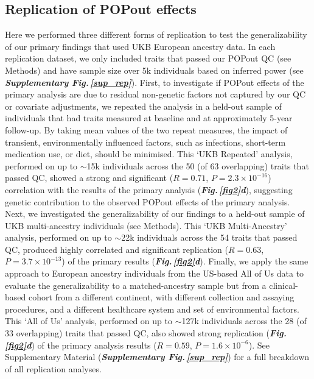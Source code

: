 \documentclass[12pt]{zHenriquesLab-StyleBioRxiv}
\newcommand\dref[2]{\normalsize{\textbf{\textit{Fig.\,\ref{#1}#2}}}\normalsize{}}
\newcommand\sref[1]{\normalsize{\textbf{\textit{Supplementary Fig.\,\ref{#1}}}}\normalsize{}}
\begin{document}
{{%
\subsection*{Replication of POPout effects} \label{sec:res1}
Here we performed three different forms of replication to test the generalizability of our primary 
findings that used UKB European ancestry data. In each replication dataset, 
we only included traits that passed our POPout QC (see Methods) and have sample size 
over 5k individuals based on inferred power (see \sref{sup_rep}). First, 
to investigate if POPout effects of the primary analysis are due to residual 
non-genetic factors not captured by our QC or covariate adjustments, we repeated 
the analysis in a held-out sample of individuals that had traits measured at 
baseline and at approximately 5-year follow-up. By taking mean values of the 
two repeat measures, the impact of transient, environmentally influenced factors, 
such as infections, short-term medication use, or diet, should be minimised. 
This ‘UKB Repeated’ analysis, performed on up to $\sim$15k individuals across the 
50 (of 63 overlapping) traits that passed QC, showed a strong and 
significant ($R=0.71$, $P=2.3 \times 10^{-16}$) correlation with the results 
of the primary analysis (\dref{fig2}{d}), suggesting genetic contribution to the 
observed POPout effects of the primary analysis. Next, we investigated the generalizability 
of our findings to a held-out sample of UKB multi-ancestry individuals (see Methods). 
This ‘UKB Multi-Ancestry’ analysis, performed on up to $\sim$22k individuals across the 
54 traits that passed QC, produced highly correlated and significant 
replication ($R=0.63$, $P=3.7 \times 10^{-13}$) of the primary results (\dref{fig2}{d}). 
Finally, we apply the same approach to European ancestry individuals from the 
US-based All of Us data \cite{Bick2024} to evaluate the generalizability to a matched-ancestry 
sample but from a clinical-based cohort from a different continent, with different 
collection and assaying procedures, and a different healthcare system and set of 
environmental factors. This ‘All of Us’ analysis, performed on up to $\sim$127k individuals 
across the 28 (of 33 overlapping) traits that passed QC, also showed strong replication (\dref{fig2}{d}) of the primary 
analysis results ($R=0.59$, $P=1.6 \times 10^{-6}$). 
See Supplementary Material (\sref{sup_rep}) for a full breakdown of all replication analyses. 
%
%
}}
\end{document}
